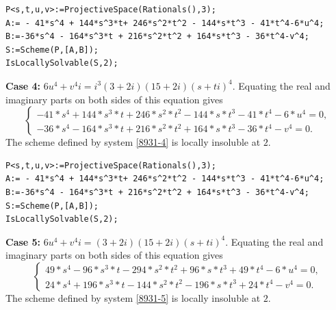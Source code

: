\documentclass[a4paper,12pt,english,reqno]{amsart}
\begin{document}
\begin{lstlisting}
P<s,t,u,v>:=ProjectiveSpace(Rationals(),3);
A:= - 41*s^4 + 144*s^3*t+ 246*s^2*t^2 - 144*s*t^3 - 41*t^4-6*u^4;
B:=-36*s^4 - 164*s^3*t + 216*s^2*t^2 + 164*s*t^3 - 36*t^4-v^4;
S:=Scheme(P,[A,B]);
IsLocallySolvable(S,2);
\end{lstlisting}


{\bf Case 4:} $6u^4+v^4i=i^3(3+2i)(15+2i)(s+ti)^4$.  Equating the real and imaginary parts on both sides of this equation gives
\begin{equation}\label{8931-4}
\begin{cases}
-41*s^4 + 144*s^3*t + 246*s^2*t^2 - 144*s*t^3 - 41*t^4 - 6*u^4=0,\\
-36*s^4 - 164*s^3*t + 216*s^2*t^2 + 164*s*t^3 - 36*t^4 - v^4=0.
\end{cases}
\end{equation}
The scheme defined by system \eqref{8931-4} is locally insoluble at $2$.
%
\begin{lstlisting}
P<s,t,u,v>:=ProjectiveSpace(Rationals(),3);
A:= - 41*s^4 + 144*s^3*t+ 246*s^2*t^2 - 144*s*t^3 - 41*t^4-6*u^4;
B:=-36*s^4 - 164*s^3*t + 216*s^2*t^2 + 164*s*t^3 - 36*t^4-v^4;
S:=Scheme(P,[A,B]);
IsLocallySolvable(S,2);
\end{lstlisting}




{\bf Case 5:} $6u^4+v^4i=(3+2i)(15+2i)(s+ti)^4$. Equating the real and imaginary parts on both sides of this equation gives
\begin{equation}\label{8931-5}
\begin{cases}
49*s^4 - 96*s^3*t - 294*s^2*t^2 + 96*s*t^3 + 49*t^4 - 6*u^4=0,\\
24*s^4 + 196*s^3*t - 144*s^2*t^2 - 196*s*t^3 + 24*t^4 - v^4=0.
\end{cases}
\end{equation}
The scheme defined by system \eqref{8931-5} is locally insoluble at $2$.
\end{document}
